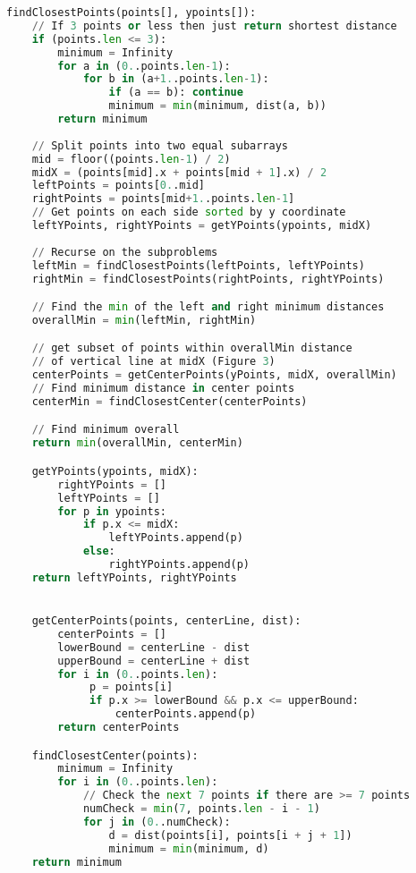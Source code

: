 \documentclass[12pt]{report}
\newcommand\mylstcaption{}
\begin{document}
\renewcommand\mylstcaption{Pseudocode for the Divide and Conquer Algorithm}
\begin{lstlisting}[language=Python, caption=\mylstcaption, label=lst:c1]
findClosestPoints(points[], ypoints[]):
    // If 3 points or less then just return shortest distance
    if (points.len <= 3):
        minimum = Infinity
        for a in (0..points.len-1):
            for b in (a+1..points.len-1):
                if (a == b): continue
                minimum = min(minimum, dist(a, b))
        return minimum
		
    // Split points into two equal subarrays
    mid = floor((points.len-1) / 2)
    midX = (points[mid].x + points[mid + 1].x) / 2
    leftPoints = points[0..mid]
    rightPoints = points[mid+1..points.len-1]
    // Get points on each side sorted by y coordinate
    leftYPoints, rightYPoints = getYPoints(ypoints, midX)
                
    // Recurse on the subproblems
    leftMin = findClosestPoints(leftPoints, leftYPoints)
    rightMin = findClosestPoints(rightPoints, rightYPoints)

    // Find the min of the left and right minimum distances
    overallMin = min(leftMin, rightMin)

    // get subset of points within overallMin distance 
    // of vertical line at midX (Figure 3)
    centerPoints = getCenterPoints(yPoints, midX, overallMin)
    // Find minimum distance in center points
    centerMin = findClosestCenter(centerPoints)

    // Find minimum overall
    return min(overallMin, centerMin)

    getYPoints(ypoints, midX):
        rightYPoints = []
        leftYPoints = []
        for p in ypoints:
            if p.x <= midX:
                leftYPoints.append(p)
            else:
                rightYPoints.append(p)
	return leftYPoints, rightYPoints


    getCenterPoints(points, centerLine, dist):
        centerPoints = []
        lowerBound = centerLine - dist
        upperBound = centerLine + dist
        for i in (0..points.len):
             p = points[i]
             if p.x >= lowerBound && p.x <= upperBound:
                 centerPoints.append(p)
        return centerPoints

    findClosestCenter(points):
        minimum = Infinity
        for i in (0..points.len):
            // Check the next 7 points if there are >= 7 points
            numCheck = min(7, points.len - i - 1)
            for j in (0..numCheck):
                d = dist(points[i], points[i + j + 1])
                minimum = min(minimum, d)
	return minimum
\end{lstlisting}
\end{document}
